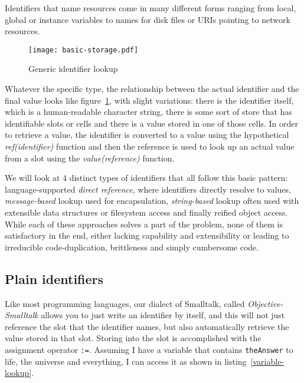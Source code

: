 \documentclass[preprint,authoryear]{acm_proc_article-sp}
\begin{document}
Identifiers that name resources come in many different forms ranging from local,
global or instance variables to names for disk files or URIs pointing to network resources.

\begin{figure}[htbp]
\begin{center}
\texttt{[image: basic-storage.pdf]}
\caption{Generic identifier lookup}
\label{identifier-eval}
\end{center}
\end{figure}

Whatever the specific type, the relationship between the actual identifier and the
final value looks like figure~\ref{identifier-eval}, with slight variations:   there is
the identifier itself, which is a human-readable character string, there is some sort
of store that has identifiable slots or cells and there is a value stored in one of those
cells.   In order to retrieve a value, the identifier is converted to a value using the
hypothetical {\em ref(identifier)} function and then the reference is used to look up an actual
value from a slot using the {\em value(reference)} function.


We will look at 4 distinct types of identifiers that all follow this basic pattern:  language-supported 
{\em direct reference}, where identifiers directly resolve to values, {\em message-based} lookup
used for encapsulation,
{\em string-based} lookup often used with extensible data structures or filesystem access and
finally reified object access.   While each of these approaches solves a part of the problem,
none of them is satisfactory in the end, either lacking capability and extensibility or leading to
irreducible code-duplication, brittleness and simply cumbersome code.

\subsection{Plain identifiers}
\label{direct-reference}
Like most programming languages, our dialect of Smalltalk, called
{\em Objective-Smalltalk} allows you to just write 
an identifier by itself, and this will not just reference the slot that the identifier names, but also
automatically retrieve the value stored in that slot.  Storing into the slot is accomplished with
the assignment operator {\tt :=}.    Assuming I have a variable that contains {\tt theAnswer} to 
life, the universe and everything, I can access it as shown in listing~\ref{variable-lookup}.
\end{document}
